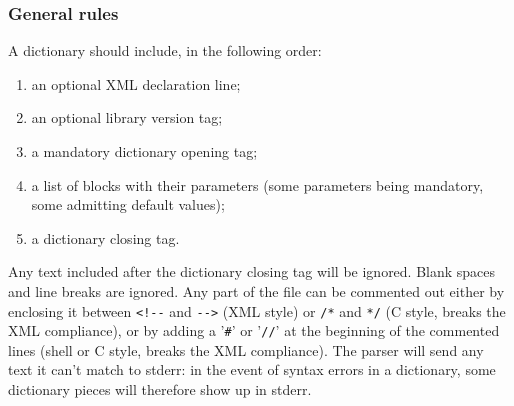 \documentclass[11pt,a4paper]{article}
\begin{document}
\subsubsection*{General rules}
A dictionary should include, in the following order:
\begin{enumerate}
\item an optional XML declaration line;
\item an optional library version tag;
\item a mandatory dictionary opening tag;
\item a list of blocks with their parameters (some parameters being mandatory,
  some admitting default values);
\item a dictionary closing tag.
\end{enumerate}
Any text included after the dictionary closing tag will be ignored. Blank
spaces and line breaks are ignored. Any part of the file can be commented out
either by enclosing it between \verb+<!--+ and \verb+-->+ (XML style) or
\verb+/*+ and \verb+*/+ (C style, breaks the XML compliance), or by adding a
'\verb+#+' or '\verb+//+' at the beginning of the commented lines (shell or C
style, breaks the XML compliance). The parser will send any text it can't match
to stderr: in the event of syntax errors in a dictionary, some dictionary
pieces will therefore show up in stderr.
\end{document}

